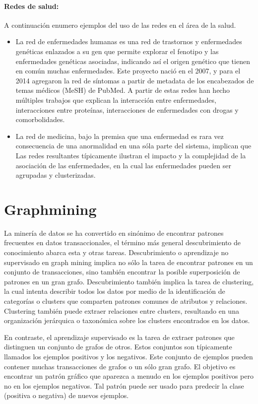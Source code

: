 \paragraph{Redes de salud:} A continuación enumero ejemplos del uso de las redes en el área de la salud.
\begin{itemize}
\item La red de enfermedades humanas\cite{Goh2007TheNetwork.} es una red de trastornos y enfermedades genéticas enlazados a su gen que permite explorar el fenotipo y las enfermedades genéticas asociadas, indicando así el origen genético que tienen en común muchas enfermedades. Este proyecto nació en el 2007, y para el 2014 agregaron la red de síntomas a partir de metadata de los encabezados de temas médicos (MeSH) de PubMed. A partir de estas redes han hecho múltiples trabajos que explican la interacción entre enfermedades, interacciones entre proteínas, interacciones de enfermedades con drogas y comorbolidades.
\item La red de medicina\cite{Haaren2013,Barabsi2011NetworkDisease}, bajo la premisa que una enfermedad es rara vez consecuencia de una anormalidad en una sóla parte del sistema, implican que Las redes resultantes típicamente ilustran el impacto y la complejidad de la asociación de las enfermedades, en la cual las enfermedades pueden ser agrupadas y clusterizadas.

\end{itemize}


\section{Graphmining}
La minería de datos se ha convertido en sinónimo de encontrar patrones frecuentes en datos transaccionales, el término más general descubrimiento de conocimiento abarca esta y otras tareas. Descubrimiento o aprendizaje no supervisado en graph mining implica no sólo la tarea de encontrar patrones en un conjunto de transacciones, sino también encontrar la posible superposición de patrones en un gran grafo. Descubrimiento también implica la tarea de clustering, la cual intenta describir todos los datos por medio de la identificación de categorías o clusters que comparten patrones comunes de atributos y relaciones. Clustering también puede extraer relaciones entre clusters, resultando en una organización jerárquica o taxonómica  sobre los clusters encontrados en los datos.\cite{Cook2006}
 
En contraste, el aprendizaje supervisado es la tarea de extraer patrones que distinguen un conjunto de grafos de otros. Estos conjuntos son típicamente llamados los ejemplos positivos y los negativos. Este conjunto de ejemplos pueden contener muchas transacciones de grafos o un sólo gran grafo. El objetivo es encontrar un patrón gráfico que aparezca a menudo en los ejemplos positivos pero no en los ejemplos negativos. Tal patrón puede ser usado para predecir la clase (positiva o negativa) de nuevos ejemplos. \cite{Cook2006}
 
